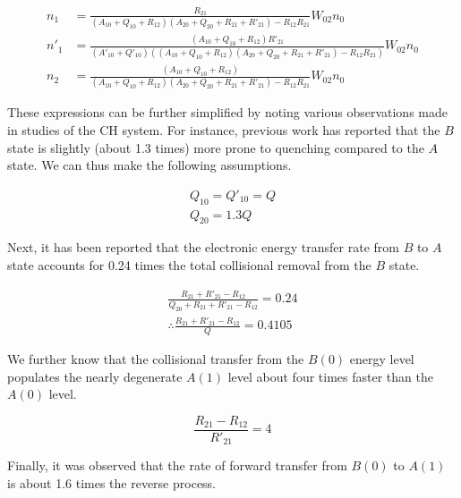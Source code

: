 \begin{align}
  n_1 &= \frac{ R_{21} }{ ( A_{10} + Q_{10} + R_{12} )( A_{20} + Q_{20} + R_{21} + R'_{21} ) - R_{12}R_{21} }W_{02}n_0
  \label{eqn:solution1}\\
  n'_1 &= \frac{ ( A_{10} + Q_{10} + R_{12} )R'_{21} }{ ( A'_{10} + Q'_{10} ) ( ( A_{10} + Q_{10} + R_{12} )( A_{20} + Q_{20} + R_{21} + R'_{21} ) - R_{12}R_{21} ) }W_{02}n_0
  \label{eqn:solution2}\\
  n_2 &= \frac{ ( A_{10} + Q_{10} + R_{12} ) }{ ( A_{10} + Q_{10} + R_{12} )( A_{20} + Q_{20} + R_{21} + R'_{21} ) - R_{12}R_{21} }W_{02}n_0
  \label{eqn:solution3}
\end{align}

These expressions can be further simplified by noting various observations made in studies of the CH system.
For instance, previous work\cite{1984-cool,1985-garland-b} has reported that the \(B\) state is slightly (about 1.3 times) more prone to quenching compared to the \(A\) state.
We can thus make the following assumptions.

\begin{gather}
  Q_{10} = Q'_{10} = Q
  \label{eqn:quenchingAssumption1}\\
  Q_{20} = 1.3Q
  \label{eqn:quenchingAssumption2}
\end{gather}

Next, it has been reported\cite{2000-luque} that the electronic energy transfer rate from \(B\) to \(A\) state accounts for 0.24 times the total collisional removal from the \(B\) state.

\begin{gather}
  \frac{ R_{21} + R'_{21} - R_{12} }{ Q_{20} + R_{21} + R'_{21} - R_{12} } = 0.24\\
  \therefore \frac{ R_{21} + R'_{21} - R_{12} }{ Q } = 0.4105
  \label{eqn:REquation1}
\end{gather}

We further know\cite{1985-garland-b, 2000-luque} that the collisional transfer from the \(B(0)\) energy level populates the nearly degenerate \(A(1)\) level about four times faster than the \(A(0)\) level.

\begin{equation}
  \frac{ R_{21} - R_{12} }{ R'_{21} } = 4
  \label{eqn:REquation2}
\end{equation}

Finally, it was observed\cite{1985-garland-b} that the rate of forward transfer from \(B(0)\) to \(A(1)\) is about 1.6 times the reverse process.

